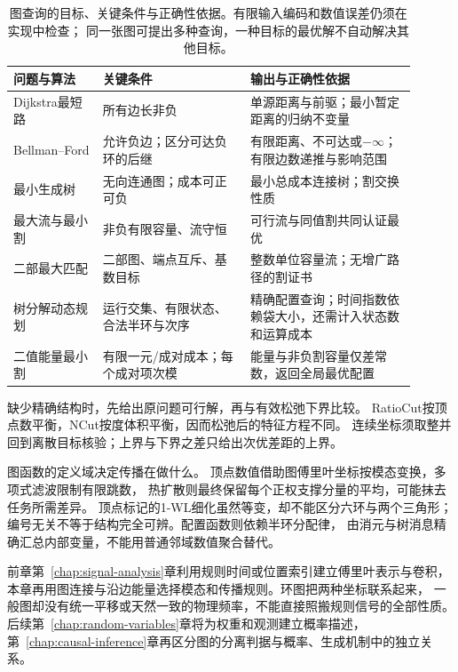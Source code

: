 \begin{table}[htbp]
  \centering
  \caption{图查询的目标、关键条件与正确性依据。有限输入编码和数值误差仍须在实现中检查；
  同一张图可提出多种查询，一种目标的最优解不自动解决其他目标。}
  \label{tab:graph-algorithm-conditions}
  \begin{tabular}{p{0.20\linewidth}p{0.33\linewidth}p{0.37\linewidth}}
    \toprule
    问题与算法 & 关键条件 & 输出与正确性依据\\
    \midrule
    Dijkstra最短路 & 所有边长非负 & 单源距离与前驱；最小暂定距离的归纳不变量\\
    Bellman--Ford & 允许负边；区分可达负环的后继 & 有限距离、不可达或\(-\infty\)；
      有限边数递推与影响范围\\
    最小生成树 & 无向连通图；成本可正可负 & 最小总成本连接树；割交换性质\\
    最大流与最小割 & 非负有限容量、流守恒 & 可行流与同值割共同认证最优\\
    二部最大匹配 & 二部图、端点互斥、基数目标 & 整数单位容量流；无增广路径的割证书\\
    树分解动态规划 & 运行交集、有限状态、合法半环与次序 &
      精确配置查询；时间指数依赖袋大小，还需计入状态数和运算成本\\
    二值能量最小割 & 有限一元/成对成本；每个成对项次模 &
      能量与非负割容量仅差常数，返回全局最优配置\\
    \bottomrule
  \end{tabular}
\end{table}

缺少精确结构时，先给出原问题可行解，再与有效松弛下界比较。
RatioCut按顶点数平衡，NCut按度体积平衡，因而松弛后的特征方程不同。
连续坐标须取整并回到离散目标核验；上界与下界之差只给出次优差距的上界。

图函数的定义域决定传播在做什么。
顶点数值借助图傅里叶坐标按模态变换，多项式滤波限制有限跳数，
热扩散则最终保留每个正权支撑分量的平均，可能抹去任务所需差异。
顶点标记的1-WL细化虽然等变，却不能区分六环与两个三角形；
编号无关不等于结构完全可辨。配置函数则依赖半环分配律，
由消元与树消息精确汇总内部变量，不能用普通邻域数值聚合替代。

前章第~\ref{chap:signal-analysis}章利用规则时间或位置索引建立傅里叶表示与卷积，
本章再用图连接与沿边能量选择模态和传播规则。环图把两种坐标联系起来，
一般图却没有统一平移或天然一致的物理频率，不能直接照搬规则信号的全部性质。
后续第~\ref{chap:random-variables}章将为权重和观测建立概率描述，
第~\ref{chap:causal-inference}章再区分图的分离判据与概率、生成机制中的独立关系。
